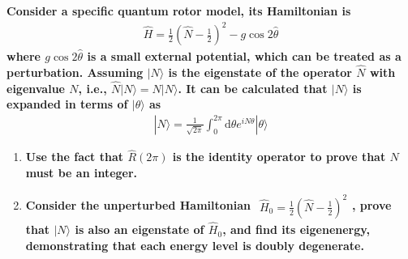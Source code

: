\documentclass[../../main.tex]{subfiles}
\begin{document}
\textbf{Consider a specific quantum rotor model, its Hamiltonian is 
\begin{align*}
  \hat{H} = \frac{1}{2}\left(\hat{N} - \frac{1}{2}\right)^{2} - g\cos{2\hat{\theta}}
\end{align*}
where $g\cos{2\hat{\theta}}$ is a small external potential, which can be treated as a perturbation. Assuming $|N\rangle$ is the eigenstate of the operator $\hat{N}$ with eigenvalue $N$, i.e., $\hat{N}|N\rangle = N|N\rangle$. It can be calculated that $|N\rangle$ is expanded in terms of $|\theta\rangle$ as 
\begin{align*}
  |N\rangle = \frac{1}{\sqrt{2\pi}}\int_{0}^{2\pi}\mathrm{d}\theta e^{iN\theta}|\theta\rangle
\end{align*}}
\begin{enumerate}
  \item \textbf{Use the fact that $\hat{R}(2\pi)$ is the identity operator to prove that $N$ must be an integer.}
  
{}
  
  \item  \textbf{Consider the unperturbed Hamiltonian $\begin{aligned}
    \hat{H}_{0} = \frac{1}{2}\left(\hat{N} - \frac{1}{2}\right)^{2}
  \end{aligned}$, prove that $|N\rangle$ is also an eigenstate of $\hat{H}_{0}$, and find its eigenenergy, demonstrating that each energy level is doubly degenerate.}
{}


\end{enumerate}
\end{document}

